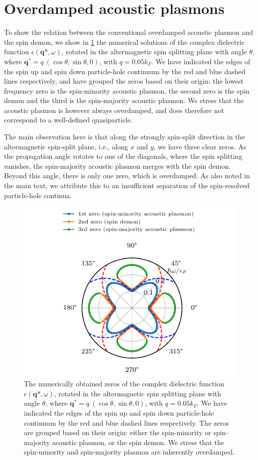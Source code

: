 \documentclass[aps,prb,reprint,twocolumns,superscriptaddress,nofootinbib]{revtex4-2}
\newcommand{\kF}{k_{F}}
\begin{document}
	\section{Overdamped acoustic plasmons}
	To show the relation between the conventional overdamped acoustic plasmon and the spin demon, we show in \cref{fig:all-zeros} the numerical solutions of the complex dielectric function $\epsilon(\bm q*,\omega)$, rotated in the altermagnetic spin splitting plane with angle $\theta$, where $\bm q^*=q\ (\cos\theta, \sin\theta,0)$, with $q=0.05\kF$. We have indicated the edges of the spin up and spin down particle-hole continuum by the red and blue dashed lines respectively, and have grouped the zeros based on their origin: the lowest frequency zero is the spin-minority acoustic plasmon, the second zero is the spin demon and the third is the spin-majority acoustic plasmon. We stress that the acoustic plasmon is however always overdamped, and does therefore not correspond to a well-defined quasiparticle. 
	
	The main observation here is that along the strongly spin-split direction in the altermagnetic spin-split plane, i.e., along $x$ and $y$, we have three clear zeros. As the propagation angle rotates to one of the diagonals, where the spin splitting vanishes, the spin-majority acoustic plasmon merges with the spin demon. Beyond this angle, there is only one zero, which is overdamped. As also noted in the main text, we attribute this to an insufficient separation of the spin-resolved particle-hole continua.
	
	
	\begin{figure}
		\includegraphics{all_zeros}
		\caption{The numerically obtained zeros of the complex dielectric function $\epsilon(\bm q*,\omega)$, rotated in the altermagnetic spin splitting plane with angle $\theta$, where $\bm q^*=q\ (\cos\theta, \sin\theta,0)$, with $q=0.05\kF$. We have indicated the edges of the spin up and spin down particle-hole continuum by the red and blue dashed lines respectively. The zeros are grouped based on their origin: either the spin-minority or spin-majority acoustic plasmon, or the spin demon. We stress that the spin-minority and spin-majority plasmon are inherently overdamped.} \label{fig:all-zeros}
	\end{figure} 
	
\end{document}
